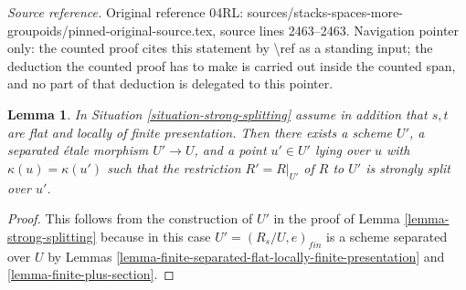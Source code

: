 \documentclass{stacks-project}
\theoremstyle{plain}
\newtheorem{lemma}[subsection]{Lemma}
\theoremstyle{definition}
\theoremstyle{remark}
\numberwithin{equation}{subsection}
\begin{document}
\noindent\textit{Source reference.} Original reference 04RL: sources/stacks-spaces-more-groupoids/pinned-original-source.tex, source lines 2463--2463. Navigation pointer only: the counted proof cites this statement by \textbackslash{}ref as a standing input; the deduction the counted proof has to make is carried out inside the counted span, and no part of that deduction is delegated to this pointer.\par\medskip
\begin{lemma}
\label{lemma-strong-splitting-scheme}
In Situation \ref{situation-strong-splitting} assume in addition that
$s, t$ are flat and locally of finite presentation.
Then there exists a scheme $U'$, a separated \'etale morphism
$U' \to U$, and a point $u' \in U'$
lying over $u$ with $\kappa(u) = \kappa(u')$
such that the restriction $R' = R|_{U'}$ of $R$ to $U'$
is strongly split over $u'$.
\end{lemma}

\begin{proof}
This follows from the construction of $U'$ in the proof of
Lemma \ref{lemma-strong-splitting}
because in this case $U' = (R_s/U, e)_{fin}$ is a scheme separated over
$U$ by
Lemmas \ref{lemma-finite-separated-flat-locally-finite-presentation} and
\ref{lemma-finite-plus-section}.
\end{proof}
\end{document}
